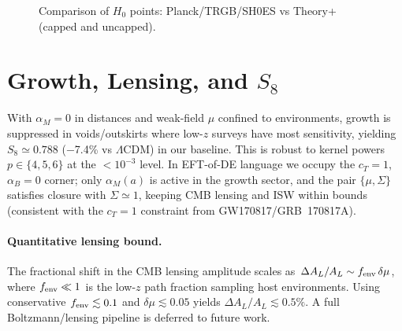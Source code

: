 \documentclass[aps,prd,onecolumn,notitlepage,superscriptaddress,nofootinbib]{revtex4-2}
\newcommand{\alpham}{\alpha_M}
\newcommand{\Hzero}{H_0}
\begin{document}
\begin{figure}[H]
\centering
{}
\caption{Comparison of \(\Hzero\) points: Planck/TRGB/SH0ES vs Theory+ (capped and uncapped).}
\end{figure}

\section{Growth, Lensing, and \texorpdfstring{$S_8$}{S8}}
With \(\alpham=0\) in distances and weak-field \(\mu\) confined to environments, growth is suppressed in voids/outskirts where low-\(z\) surveys have most sensitivity, yielding \(S_8\simeq 0.788\) (−7.4\% vs \(\Lambda\)CDM) in our baseline. This is robust to kernel powers \(p\in\{4,5,6\}\) at the \(<10^{-3}\) level. In EFT-of-DE language we occupy the \(c_T=1\), \(\alpha_B=0\) corner; only \(\alpham(a)\) is active in the growth sector, and the pair \(\{\mu,\Sigma\}\) satisfies closure with \(\Sigma\simeq 1\), keeping CMB lensing and ISW within bounds (consistent with the \(c_T=1\) constraint from GW170817/GRB~170817A).

\paragraph*{Quantitative lensing bound.}
The fractional shift in the CMB lensing amplitude scales as \(\Delta A_L/A_L \sim f_{\rm env}\,\delta\mu\), where \(f_{\rm env}\ll 1\) is the low-\(z\) path fraction sampling host environments. Using conservative \(f_{\rm env}\lesssim 0.1\) and \(\delta\mu\lesssim 0.05\) yields \(\Delta A_L/A_L \lesssim 0.5\%\). A full Boltzmann/lensing pipeline is deferred to future work.
\end{document}
